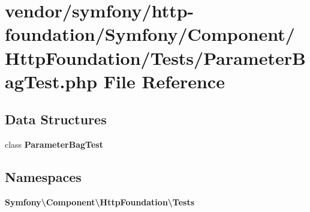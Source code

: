 \section{vendor/symfony/http-\/foundation/\+Symfony/\+Component/\+Http\+Foundation/\+Tests/\+Parameter\+Bag\+Test.php File Reference}
\label{_parameter_bag_test_8php}
\subsection*{Data Structures}
\begin{DoxyCompactItemize}
\item 
class {\bf Parameter\+Bag\+Test}
\end{DoxyCompactItemize}
\subsection*{Namespaces}
\begin{DoxyCompactItemize}
\item 
 {\bf Symfony\textbackslash{}\+Component\textbackslash{}\+Http\+Foundation\textbackslash{}\+Tests}
\end{DoxyCompactItemize}
